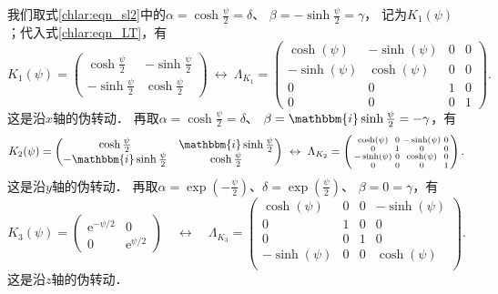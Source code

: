 我们取式\eqref{chlar:eqn_sl2}中的$\alpha=\cosh \frac{\psi}{2}=\delta$、
$\beta=-\sinh \frac{\psi}{2}=\gamma$，
记为$K_1(\psi)$；代入式\eqref{chlar:eqn_LT}，有
\begin{equation}\label{chlar:eqn_sL2-x}
    K_1(\psi)=\begin{pmatrix}
        \cosh \frac{\psi}{2} & -\sinh \frac{\psi}{2} \\
        -\sinh \frac{\psi}{2} & \cosh \frac{\psi}{2}
    \end{pmatrix}
    \ \leftrightarrow \
    \Lambda_{K_1}=\left(\begin{smallmatrix}
            \cosh (\psi ) & -\sinh (\psi ) & 0 & 0 \\
            -\sinh (\psi ) & \cosh (\psi ) & 0 & 0 \\
            0 & 0 & 1 & 0 \\
            0 & 0 & 0 & 1 
    \end{smallmatrix} \right).
\end{equation}
这是沿$x$轴的伪转动．
再取$\alpha=\cosh \frac{\psi}{2}=\delta$、
$ \beta=\mathbbm{i}\sinh \frac{\psi}{2}=-\gamma$，有
\begin{equation}\label{chlar:eqn_sL2-y}
    K_2(\psi)=\begin{pmatrix}
        \cosh \frac{\psi}{2} & \mathbbm{i} \sinh \frac{\psi}{2} \\
        -\mathbbm{i} \sinh \frac{\psi}{2} & \cosh \frac{\psi}{2}
    \end{pmatrix}
    \ \leftrightarrow \
    \Lambda_{K_2}=\left(\begin{smallmatrix}
            \cosh (\psi ) & 0 & -\sinh (\psi ) & 0 \\
            0 & 1 & 0 & 0 \\
            -\sinh (\psi ) & 0 & \cosh (\psi ) & 0 \\
            0 & 0 & 0 & 1 \\
    \end{smallmatrix} \right) .
\end{equation}
这是沿$y$轴的伪转动．
再取$\alpha=\exp(-\frac{\psi}{2})$、$ \delta=\exp(\frac{\psi}{2})$、
$\beta=0=\gamma$，有
\begin{equation}\label{chlar:eqn_sL2-z}
    K_3(\psi)= \begin{pmatrix}
        \mathrm{e}^{-\psi / 2} & 0 \\
        0 & \mathrm{e}^{\psi / 2}
    \end{pmatrix}
    \quad \leftrightarrow \quad
    \Lambda_{K_3}=\left(\begin{smallmatrix}
            \cosh (\psi ) & 0 & 0 & -\sinh (\psi ) \\
            0 & 1 & 0 & 0 \\
            0 & 0 & 1 & 0 \\
            -\sinh (\psi ) & 0 & 0 & \cosh (\psi ) \\
   \end{smallmatrix} \right) .
\end{equation}
这是沿$z$轴的伪转动．








